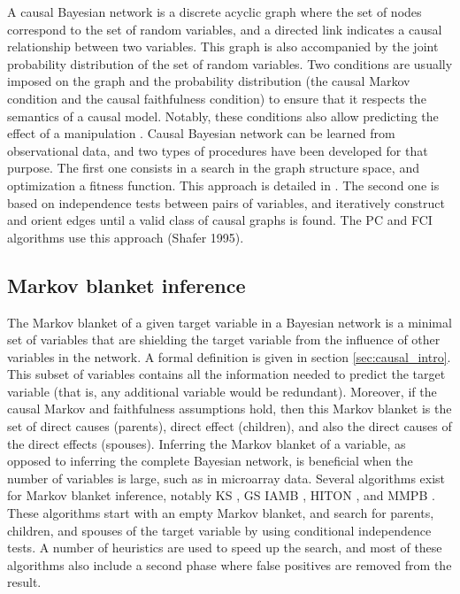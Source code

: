 A causal Bayesian network is a discrete
acyclic graph where the set of nodes correspond to the set of random variables,
and a directed link indicates a causal relationship between two variables. This
graph is also accompanied by the joint probability distribution of the set of
random variables. Two conditions are usually imposed on the graph and the
probability distribution (the causal Markov condition and the causal
faithfulness condition) to ensure that it respects the semantics of a causal
model. Notably, these conditions also allow predicting the effect of a
manipulation \parencite{spirtes2010introduction}. Causal Bayesian network can be
learned from observational data, and two types of procedures have been developed
for that purpose. The first one consists in a search in the graph structure
space, and optimization a fitness function. This approach is detailed in
\parencite{heckerman1998tutorial}. The second one is based on independence tests
between pairs of variables, and iteratively construct and orient edges until a
valid class of causal graphs is found. The PC and FCI algorithms use this
approach (Shafer 1995).

\subsection{Markov blanket inference}

The Markov blanket of a given target variable in a Bayesian network is a minimal
set of variables that are shielding the target variable from the influence of
other variables in the network. A formal definition is given in section
\ref{sec:causal_intro}. This subset of variables contains all the information
needed to predict the target variable (that is, any additional variable would be
redundant). Moreover, if the causal Markov and faithfulness assumptions hold,
then this Markov blanket is the set of direct causes (parents), direct effect
(children), and also the direct causes of the direct effects (spouses).
Inferring the Markov blanket of a variable, as opposed to inferring the complete
Bayesian network, is beneficial when the number of variables is large, such as
in microarray data. Several algorithms exist for Markov blanket inference,
notably KS \parencite{koller1996towards}, GS \parencite{margaritis2000bayesian}
IAMB \parencite{tsamardinos2003time}, HITON \parencite{aliferis2003hiton}, and
MMPB \parencite{tsamardinos2003time}. These algorithms start with an empty
Markov blanket, and search for parents, children, and spouses of the target
variable by using conditional independence tests. A number of heuristics are
used to speed up the search, and most of these algorithms also include a second
phase where false positives are removed from the result.


